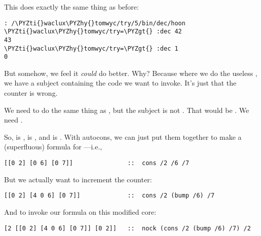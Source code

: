 This does exactly the same thing as before:

\begin{framed_shaded}
\begin{Verbatim}[fontsize=\relsize{-2.5},fontseries=b,commandchars=\\\{\}]
: /\PYZti{}waclux\PYZhy{}tomwyc/try/5/bin/dec/hoon
\PYZti{}waclux\PYZhy{}tomwyc/try=\PYZgt{} :dec 42
43
\PYZti{}waclux\PYZhy{}tomwyc/try=\PYZgt{} :dec 1
0
\end{Verbatim}
\end{framed_shaded}

But somehow, we feel it \emph{could} do better.  Why?  Because where
we do the useless \kode{[4 0 7]}, we have a subject containing the
code we want to invoke.  It's just that the counter is wrong.

We need to do the same thing as \kode{[2 [0 1] [0 2]}, but the subject
is not \kode{[0 1]}.  That would be .  We
need .

So,  is \kode{[0 2]},  is \kode{[0 6]}, and  is
\kode{[0 7]}.  With autocons, we can just put them together to make a
(superfluous) formula for ---i.e.,

\begin{framed_shaded}
\begin{Verbatim}[fontsize=\relsize{-2.5},fontseries=b,commandchars=\\\{\}]
[[0 2] [0 6] [0 7]]               ::  cons /2 /6 /7
\end{Verbatim}
\end{framed_shaded}

But we actually want to increment the counter:

\begin{framed_shaded}
\begin{Verbatim}[fontsize=\relsize{-2.5},fontseries=b,commandchars=\\\{\}]
[[0 2] [4 0 6] [0 7]]             ::  cons /2 (bump /6) /7
\end{Verbatim}
\end{framed_shaded}

And to invoke our formula on this modified core:

\begin{framed_shaded}
\begin{Verbatim}[fontsize=\relsize{-2.5},fontseries=b,commandchars=\\\{\}]
[2 [[0 2] [4 0 6] [0 7]] [0 2]]   ::  nock (cons /2 (bump /6) /7) /2
\end{Verbatim}
\end{framed_shaded}

